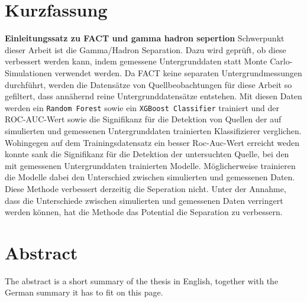 \thispagestyle{plain}

\section*{Kurzfassung}
\textbf{Einleitungssatz zu FACT und gamma hadron sepertion}
Schwerpunkt dieser Arbeit ist die Gamma/Hadron Separation. 
Dazu wird geprüft, ob diese verbessert werden kann, indem gemessene Untergrunddaten statt Monte Carlo-Simulationen verwendet werden.
Da FACT keine separaten Untergrundmessungen durchführt, werden die Datensätze von Quellbeobachtungen für diese Arbeit so gefiltert, dass annähernd reine Untergrunddatensätze entstehen.
Mit diesen Daten werden ein \texttt{Random Forest} sowie ein \texttt{XGBoost Classifier} trainiert und der ROC-AUC-Wert sowie die Signifikanz für die Detektion von Quellen der auf simulierten und gemessenen Untergrunddaten trainierten Klassifizierer verglichen. 
Wohingegen auf dem Trainingsdatensatz ein besser Roc-Auc-Wert erreicht weden konnte sank die Signifikanz für die Detektion der untersuchten Quelle, bei den mit gemessenen Untergrunddaten trainierten Modelle.
Möglicherweise trainieren die Modelle dabei den Unterschied zwischen simulierten und gemessenen Daten. 
Diese Methode verbessert derzeitig die Seperation nicht. 
Unter der Annahme, dass die Unterschiede zwischen simulierten und gemessenen Daten verringert werden können, hat die Methode das Potential die Separation zu verbessern. 
\section*{Abstract}
\begin{english}
The abstract is a short summary of the thesis in English, together with the German summary it has to fit on this page.
\end{english}
